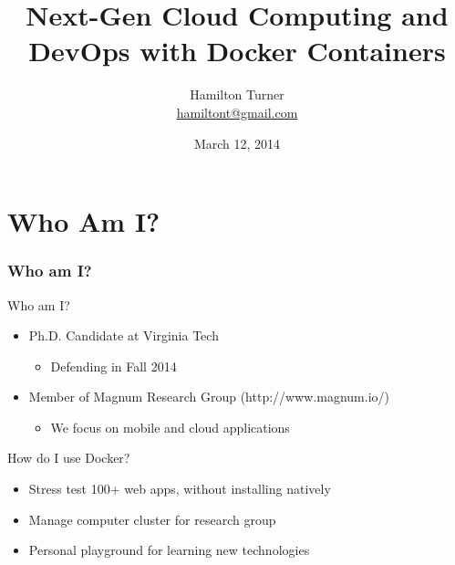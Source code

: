 \documentclass[xcolor=dvipsnames]{beamer}
\title[]{Next-Gen Cloud Computing and DevOps with Docker Containers}
\author[]{Hamilton Turner\\{\small \url{hamiltont@gmail.com}}}
\date[March 2014]{March 12, 2014}
\newcommand{\cpause}{}
\begin{document}
\begin{frame}
\maketitle
\end{frame}

\section{Who Am I?}
\begin{frame}
  \frametitle{Who am I?}

  Who am I?
  \begin{itemize}
    \item Ph.D. Candidate at Virginia Tech
      \cpause
      \begin{itemize}
      \item Defending in Fall 2014
      \cpause
      \end{itemize}
    \item Member of Magnum Research Group (http://www.magnum.io/)
      \begin{itemize}
      \item We focus on mobile and cloud applications
      \end{itemize}
  \end{itemize}
  \cpause

  How do I use Docker? 
  \begin{itemize}
    \item Stress test 100+ web apps, without installing natively \cpause
    \item Manage computer cluster for research group \cpause
    \item Personal playground for learning new technologies 
  \end{itemize}
\end{frame}
\end{document}
